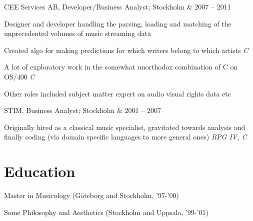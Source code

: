 \documentclass[letterpaper]{scrartcl}
\begin{document}
\begin{list1}
\item \begin{tabular1bold} CEE Services AB, Developer/Business Analyst; Stockholm & 2007 -- 2011 \end{tabular1bold}

  \begin{list2}
    \item Designer and developer handling the parsing, loading and matching of the unprecedented volumes of music streaming data
    \begin{list3}
      \item Created algo for making predictions for which writers belong to which artists \hfill \emph{C}
      \item A lot of exploratory work in the somewhat unorthodox combination of C on OS/400 \hfill \emph{C}
    \end{list3}
    \item Other roles included subject matter expert on audio visual rights data etc
  \end{list2}

\item \begin{tabular1bold} STIM, Business Analyst; Stockholm & 2001 -- 2007 \end{tabular1bold}

  \begin{list2}
  \item Originally hired as a classical music specialist, gravitated towards analysis and finally coding (via domain specific languages to more general ones)  \hfill \emph{RPG IV, C}
  \end{list2}


\end{list1}

\section*{Education}
\begin{list1}
\item
  \begin{tabular1bold}Master in Musicology (Göteborg and Stockholm, '97-'00)\end{tabular1bold}
  \begin{tabular1bold}Some Philosophy and Aesthetics (Stockholm and Uppsala, '99-'01)\end{tabular1bold}
\end{list1}
\end{document}
